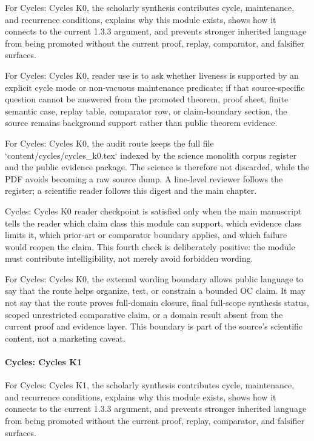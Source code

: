 For Cycles: Cycles K0, the scholarly synthesis contributes cycle, maintenance, and recurrence conditions, explains why this module exists, shows how it connects to the current 1.3.3 argument, and prevents stronger inherited language from being promoted without the current proof, replay, comparator, and falsifier surfaces.


For Cycles: Cycles K0, reader use is to ask whether liveness is supported by an explicit cycle mode or non-vacuous maintenance predicate; if that source-specific question cannot be answered from the promoted theorem, proof sheet, finite semantic case, replay table, comparator row, or claim-boundary section, the source remains background support rather than public theorem evidence.


For Cycles: Cycles K0, the audit route keeps the full file `content/cycles/cycles\_k0.tex` indexed by the science monolith corpus register and the public evidence package. The science is therefore not discarded, while the PDF avoids becoming a raw source dump. A line-level reviewer follows the register; a scientific reader follows this digest and the main chapter.


Cycles: Cycles K0 reader checkpoint is satisfied only when the main manuscript tells the reader which claim class this module can support, which evidence class limits it, which prior-art or comparator boundary applies, and which failure would reopen the claim. This fourth check is deliberately positive: the module must contribute intelligibility, not merely avoid forbidden wording.


For Cycles: Cycles K0, the external wording boundary allows public language to say that the route helps organize, test, or constrain a bounded OC claim. It may not say that the route proves full-domain closure, final full-scope synthesis status, scoped unrestricted comparative claim, or a domain result absent from the current proof and evidence layer. This boundary is part of the source's scientific content, not a marketing caveat.


\paragraph{Cycles: Cycles K1}

For Cycles: Cycles K1, the scholarly synthesis contributes cycle, maintenance, and recurrence conditions, explains why this module exists, shows how it connects to the current 1.3.3 argument, and prevents stronger inherited language from being promoted without the current proof, replay, comparator, and falsifier surfaces.


